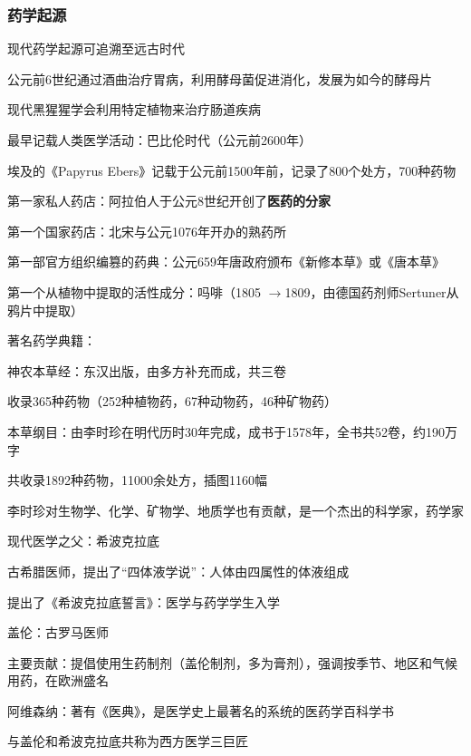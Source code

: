 \subsubsection{药学起源}%
\label{subsub:药学起源}
现代药学起源可追溯至远古时代
\begin{eg}
    公元前6世纪通过酒曲治疗胃病，利用酵母菌促进消化，发展为如今的酵母片
\end{eg}
\begin{eg}
    现代黑猩猩学会利用特定植物来治疗肠道疾病
\end{eg}
\begin{notation}
    最早记载人类医学活动：巴比伦时代（公元前2600年）

    埃及的《Papyrus Ebers》记载于公元前1500年前，记录了800个处方，700种药物

    第一家私人药店：阿拉伯人于公元8世纪开创了\textbf{医药的分家}

    第一个国家药店：北宋与公元1076年开办的熟药所

    第一部官方组织编篡的药典：公元659年唐政府颁布《新修本草》或《唐本草》

    第一个从植物中提取的活性成分：吗啡（1805 $\to $1809，由德国药剂师Sertuner从鸦片中提取）
\end{notation}
著名药学典籍：
\begin{notation}
    神农本草经：东汉出版，由多方补充而成，共三卷

    收录365种药物（252种植物药，67种动物药，46种矿物药）
\end{notation}
\begin{notation}
    本草纲目：由李时珍在明代历时30年完成，成书于1578年，全书共52卷，约190万字

    共收录1892种药物，11000余处方，插图1160幅
\end{notation}
李时珍对生物学、化学、矿物学、地质学也有贡献，是一个杰出的科学家，药学家
\begin{notation}
    现代医学之父：希波克拉底

    古希腊医师，提出了“四体液学说”：人体由四属性的体液组成

    提出了《希波克拉底誓言》：医学与药学学生入学
\end{notation}
\begin{notation}
    盖伦：古罗马医师

    主要贡献：提倡使用生药制剂（盖伦制剂，多为膏剂），强调按季节、地区和气候用药，在欧洲盛名
\end{notation}
\begin{notation}
    阿维森纳：著有《医典》，是医学史上最著名的系统的医药学百科学书

    与盖伦和希波克拉底共称为西方医学三巨匠
\end{notation}
